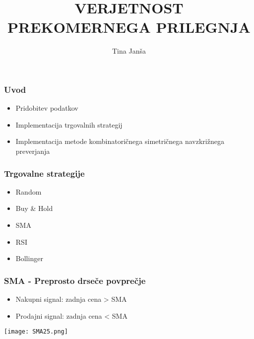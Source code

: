 \documentclass{beamer}
\title[Verjetnost prekomernega prileganja]{VERJETNOST PREKOMERNEGA PRILEGNJA}
\author[Tina Janša]{Tina Janša}
\begin{document}
\begin{frame}
\titlepage
\end{frame}


\begin{frame}
\frametitle{Uvod}

\begin{itemize}
\item Pridobitev podatkov \pause
\item Implementacija trgovalnih strategij 
\item Implementacija metode kombinatoričnega simetričnega navzkrižnega preverjanja
\end{itemize}

\end{frame}



\begin{frame}
\frametitle{Trgovalne strategije}
\begin{itemize}
\item Random \pause
\item Buy \& Hold \pause
\item SMA
\item RSI
\item Bollinger
\end{itemize}
\end{frame}


\begin{frame}
\frametitle{SMA - Preprosto drseče povprečje}
\begin{itemize}
\item Nakupni signal: zadnja cena > SMA
\item Prodajni signal: zadnja cena < SMA
\end{itemize}

\texttt{[image: SMA25.png]}

\end{frame}
\end{document}
